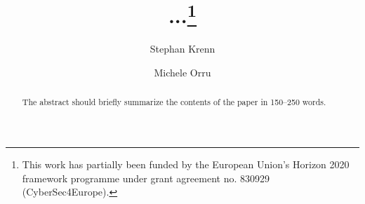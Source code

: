 \documentclass[runningheads]{llncs}
\begin{document}
\title{...\thanks{This work has partially been funded by the European Union's Horizon 2020 framework programme under grant agreement no. 830929 (CyberSec4Europe).}}
%

\author{Stephan Krenn \and
        Michele Orru}


%
\maketitle              %
%
\begin{abstract}
The abstract should briefly summarize the contents of the paper in
150--250 words.

\end{abstract}



%
\end{document}
